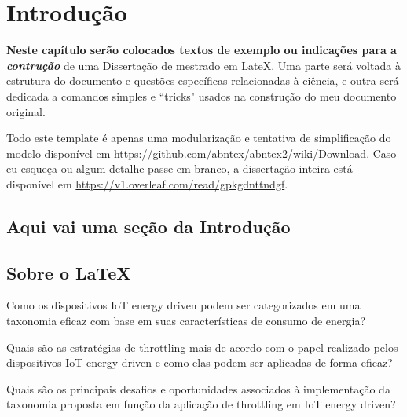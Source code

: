 \chapter{Introdução}
\label{cap:cap1}

\textbf{Neste capítulo serão colocados textos de exemplo ou indicações para a \textit{contrução}} de uma Dissertação de mestrado em LateX. Uma parte será voltada à estrutura do documento e questões específicas relacionadas à ciência, e outra será dedicada a comandos simples e ``tricks" usados na construção do meu documento original.

Todo este template é apenas uma modularização e tentativa de simplificação do modelo disponível em \url{https://github.com/abntex/abntex2/wiki/Download}. Caso eu esqueça ou algum detalhe passe em branco, a dissertação inteira está disponível em \url{https://v1.overleaf.com/read/gpkgdnttndgf}.


\section{Aqui vai uma seção da Introdução}

\section{Sobre o \LaTeX}


Como os dispositivos IoT energy driven podem ser categorizados em uma taxonomia eficaz com base em suas características de consumo de energia?

Quais são as estratégias de throttling mais de acordo com o papel realizado pelos dispositivos IoT energy driven e como elas podem ser aplicadas de forma eficaz?

Quais são os principais desafios e oportunidades associados à implementação da taxonomia proposta em função da aplicação de throttling em IoT energy driven?